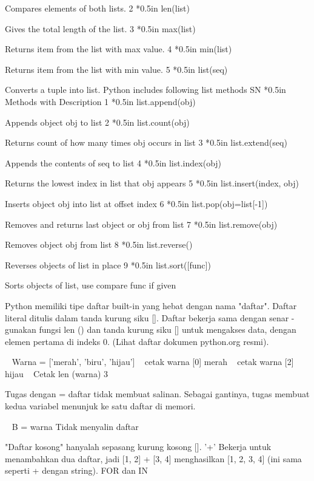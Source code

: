 Compares elements of both lists. 
2 *{0.5in} len(list) 

Gives the total length of the list. 
3 *{0.5in} max(list) 

Returns item from the list with max value. 
4 *{0.5in} min(list) 

Returns item from the list with min value. 
5 *{0.5in} list(seq) 

Converts a tuple into list. 
Python includes following list methods 
SN *{0.5in} Methods with Description 
1 *{0.5in} list.append(obj) 

Appends object obj to list 
2 *{0.5in} list.count(obj) 

Returns count of how many times obj occurs in list 
3 *{0.5in} list.extend(seq) 

Appends the contents of seq to list 
4 *{0.5in} list.index(obj) 

Returns the lowest index in list that obj appears 
5 *{0.5in} list.insert(index, obj) 

Inserts object obj into list at offset index 
6 *{0.5in} list.pop(obj=list[-1]) 

Removes and returns last object or obj from list 
7 *{0.5in} list.remove(obj) 

Removes object obj from list 
8 *{0.5in} list.reverse() 

Reverses objects of list in place 
9 *{0.5in} list.sort([func]) 

Sorts objects of list, use compare func if given 

Python memiliki tipe daftar built-in yang hebat dengan nama "daftar". Daftar literal ditulis dalam tanda kurung siku []. Daftar bekerja sama dengan senar - gunakan fungsi len () dan tanda kurung siku [] untuk mengakses data, dengan elemen pertama di indeks 0. (Lihat daftar dokumen python.org resmi). 

~ Warna = ['merah', 'biru', 'hijau'] 
~ cetak warna [0]            merah 
~ cetak warna [2]            hijau 
~ Cetak len (warna)            3 


  
Tugas dengan = daftar tidak membuat salinan. Sebagai gantinya, tugas membuat kedua variabel menunjuk ke satu daftar di memori. 

~ B = warna            Tidak menyalin daftar 
  
"Daftar kosong" hanyalah sepasang kurung kosong []. '+' Bekerja untuk menambahkan dua daftar, jadi [1, 2] + [3, 4] menghasilkan [1, 2, 3, 4] (ini sama seperti + dengan string). 
FOR dan IN 

